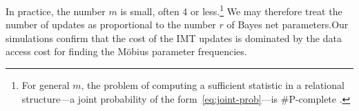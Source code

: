 \documentclass[oribibl]{llncs}
\begin{document}
 In practice, the number $m$ is small, often 4 or less.\footnote{For general $m$, the problem of computing a sufficient statistic in a relational structure---a joint probability of the form~\eqref{eq:joint-prob}---is \#P-complete \cite[Prop.12.4]{Domingos2007}.} We may therefore treat the number of updates as proportional to the number $r$ of Bayes net parameters.Our simulations confirm that  the cost of the IMT updates is dominated by the data access cost for finding the M\"obius parameter frequencies.  
%
\end{document}
